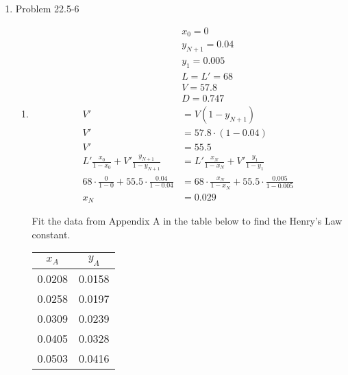 \documentclass[12pt]{article}
\begin{document}
\begin{enumerate}
\newpage
    \item Problem 22.5-6
    \begin{enumerate}
        \item
        \begin{align*}
            & x_0 = 0 \\
            & y_{N+1} = 0.04 \\ 
            & y_1 = 0.005 \\
            & L = L' = 68 \\
            & V = 57.8 \\
            & D = 0.747 \\
            V' &= V (1 - y_{N+1}) \\
            V' &= 57.8 \cdot (1 - 0.04) \\
            V' &= 55.5 \\
            L' \frac{x_0}{1 - x_0} + V' \frac{y_{N+1}}{1 - y_{N+1}} &= L' \frac{x_N}{1 - x_N} + V' \frac{y_1}{1 - y_1} \\
            68 \cdot \frac{0}{1 - 0} + 55.5 \cdot \frac{0.04}{1 - 0.04} &= 68 \cdot \frac{x_N}{1 - x_N} + 55.5 \cdot \frac{0.005}{1 - 0.005} \\
            x_N &= 0.029
        \end{align*} 
    
        Fit the data from Appendix A in the table below to find the Henry's Law constant.
    
        \begin{tabular}{|c|c|}
            \hline
            $x_A$ & $y_A$ \\
            \hline
            0.0208 & 0.0158 \\ 
            0.0258 & 0.0197 \\ 
            0.0309 & 0.0239 \\ 
            0.0405 & 0.0328 \\ 
            0.0503 & 0.0416 \\
            \hline
        \end{tabular}
    

\end{enumerate}
\end{enumerate}
\end{document}
